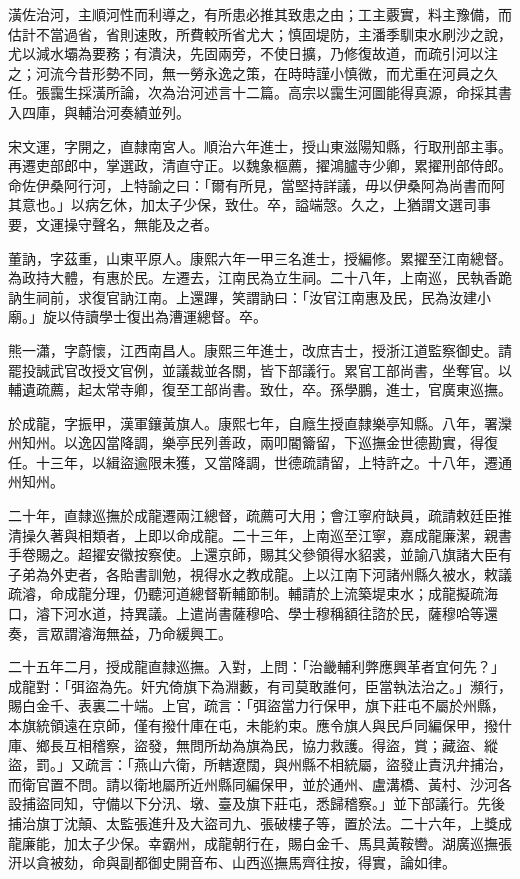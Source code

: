 \begin{pinyinscope}
潢佐治河，主順河性而利導之，有所患必推其致患之由；工主覈實，料主豫備，而估計不當過省，省則速敗，所費較所省尤大；慎固堤防，主潘季馴束水刷沙之說，尤以減水壩為要務；有潰決，先固兩旁，不使日擴，乃修復故道，而疏引河以注之；河流今昔形勢不同，無一勞永逸之策，在時時謹小慎微，而尤重在河員之久任。張靄生採潢所論，次為治河述言十二篇。高宗以靄生河圖能得真源，命採其書入四庫，與輔治河奏績並列。

宋文運，字開之，直隸南宮人。順治六年進士，授山東滋陽知縣，行取刑部主事。再遷吏部郎中，掌選政，清直守正。以魏象樞薦，擢鴻臚寺少卿，累擢刑部侍郎。命佐伊桑阿行河，上特諭之曰：「爾有所見，當堅持詳議，毋以伊桑阿為尚書而阿其意也。」以病乞休，加太子少保，致仕。卒，謚端愨。久之，上猶謂文選司事要，文運操守聲名，無能及之者。

董訥，字茲重，山東平原人。康熙六年一甲三名進士，授編修。累擢至江南總督。為政持大體，有惠於民。左遷去，江南民為立生祠。二十八年，上南巡，民執香跪訥生祠前，求復官訥江南。上還蹕，笑謂訥曰：「汝官江南惠及民，民為汝建小廟。」旋以侍讀學士復出為漕運總督。卒。

熊一瀟，字蔚懷，江西南昌人。康熙三年進士，改庶吉士，授浙江道監察御史。請罷投誠武官改授文官例，並議裁並各關，皆下部議行。累官工部尚書，坐奪官。以輔遺疏薦，起太常寺卿，復至工部尚書。致仕，卒。孫學鵬，進士，官廣東巡撫。

於成龍，字振甲，漢軍鑲黃旗人。康熙七年，自廕生授直隸樂亭知縣。八年，署灤州知州。以逸囚當降調，樂亭民列善政，兩叩閽籥留，下巡撫金世德勘實，得復任。十三年，以緝盜逾限未獲，又當降調，世德疏請留，上特許之。十八年，遷通州知州。

二十年，直隸巡撫於成龍遷兩江總督，疏薦可大用；會江寧府缺員，疏請敕廷臣推清操久著與相類者，上即以命成龍。二十三年，上南巡至江寧，嘉成龍廉潔，親書手卷賜之。超擢安徽按察使。上還京師，賜其父參領得水貂裘，並諭八旗諸大臣有子弟為外吏者，各貽書訓勉，視得水之教成龍。上以江南下河諸州縣久被水，敕議疏濬，命成龍分理，仍聽河道總督靳輔節制。輔請於上流築堤束水；成龍擬疏海口，濬下河水道，持異議。上遣尚書薩穆哈、學士穆稱額往諮於民，薩穆哈等還奏，言眾謂濬海無益，乃命緩興工。

二十五年二月，授成龍直隸巡撫。入對，上問：「治畿輔利弊應興革者宜何先？」成龍對：「弭盜為先。奸宄倚旗下為淵藪，有司莫敢誰何，臣當執法治之。」瀕行，賜白金千、表裏二十端。上官，疏言：「弭盜當力行保甲，旗下莊屯不屬於州縣，本旗統領遠在京師，僅有撥什庫在屯，未能約束。應令旗人與民戶同編保甲，撥什庫、鄉長互相稽察，盜發，無問所劫為旗為民，協力救護。得盜，賞；藏盜、縱盜，罰。」又疏言：「燕山六衛，所轄遼闊，與州縣不相統屬，盜發止責汛弁捕治，而衛官置不問。請以衛地屬所近州縣同編保甲，並於通州、盧溝橋、黃村、沙河各設捕盜同知，守備以下分汛、墩、臺及旗下莊屯，悉歸稽察。」並下部議行。先後捕治旗丁沈顛、太監張進升及大盜司九、張破樓子等，置於法。二十六年，上獎成龍廉能，加太子少保。幸霸州，成龍朝行在，賜白金千、馬具黃鞍轡。湖廣巡撫張汧以貪被劾，命與副都御史開音布、山西巡撫馬齊往按，得實，論如律。


\end{pinyinscope}
